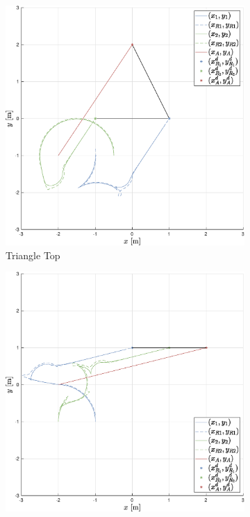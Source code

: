 \documentclass{ifacconf}
\begin{document}
\begin{figure}
    \centering
    \begin{subfigure}[b]{0.32\columnwidth}
        \centering
        \includegraphics[width=\linewidth]{images/simulations/with_APF/1st_scenario_with.eps}
         \caption{Triangle Top}
    \end{subfigure}
    \begin{subfigure}[b]{0.32\columnwidth}
        \centering
        \includegraphics[width=\linewidth]{images/simulations/with_APF/2nd_scenario_with.eps}

\end{subfigure}
\end{figure}
\end{document}
